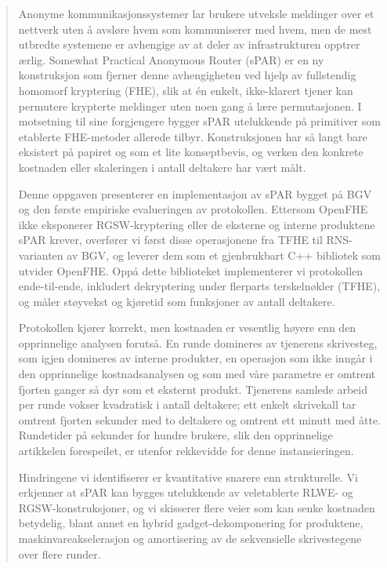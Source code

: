 \ifenglish
\else
\resetlanguage
\fi
\pagestyle{empty}
\begin{abstract}
\noindent Anonyme kommunikasjonssystemer lar brukere utveksle meldinger over et nettverk uten å avsløre hvem som kommuniserer med hvem, men de mest utbredte systemene er avhengige av at deler av infrastrukturen opptrer ærlig. Somewhat Practical Anonymous Router (sPAR) er en ny konstruksjon som fjerner denne avhengigheten ved hjelp av fullstendig homomorf kryptering (FHE), slik at én enkelt, ikke-klarert tjener kan permutere krypterte meldinger uten noen gang å lære permutasjonen. I motsetning til sine forgjengere bygger sPAR utelukkende på primitiver som etablerte FHE-metoder allerede tilbyr. Konstruksjonen har så langt bare eksistert på papiret og som et lite konseptbevis, og verken den konkrete kostnaden eller skaleringen i antall deltakere har vært målt.

Denne oppgaven presenterer en implementasjon av sPAR bygget på BGV og den første empiriske evalueringen av protokollen. Ettersom OpenFHE ikke eksponerer RGSW-kryptering eller de eksterne og interne produktene sPAR krever, overfører vi først disse operasjonene fra TFHE til RNS-varianten av BGV, og leverer dem som et gjenbrukbart C++ bibliotek som utvider OpenFHE. Oppå dette biblioteket implementerer vi protokollen ende-til-ende, inkludert dekryptering under flerparts terskelnøkler (TFHE), og måler støyvekst og kjøretid som funksjoner av antall deltakere.

Protokollen kjører korrekt, men kostnaden er vesentlig høyere enn den opprinnelige analysen forutså. En runde domineres av tjenerens skrivesteg, som igjen domineres av interne produkter, en operasjon som ikke inngår i den opprinnelige kostnadsanalysen og som med våre parametre er omtrent fjorten ganger så dyr som et eksternt produkt. Tjenerens samlede arbeid per runde vokser kvadratisk i antall deltakere; ett enkelt skrivekall tar omtrent fjorten sekunder med to deltakere og omtrent ett minutt med åtte. Rundetider på sekunder for hundre brukere, slik den opprinnelige artikkelen forespeilet, er utenfor rekkevidde for denne instansieringen.

Hindringene vi identifiserer er kvantitative snarere enn strukturelle. Vi erkjenner at sPAR kan bygges utelukkende av veletablerte RLWE- og RGSW-konstruksjoner, og vi skisserer flere veier som kan senke kostnaden betydelig, blant annet en hybrid gadget-dekomponering for produktene, maskinvareakselerasjon og amortisering av de sekvensielle skrivestegene over flere runder.
\end{abstract}
\cleardoublepage
\resetlanguage
